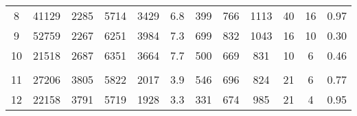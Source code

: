 \begin{tabular}[t]{cccccccccccc}
\hspace{1em}8 & 41129 & 2285 & 5714 & 3429 & 6.8 & 399 & 766 & 1113 & 40 & 16 & 0.97\\
\hspace{1em}9 & 52759 & 2267 & 6251 & 3984 & 7.3 & 699 & 832 & 1043 & 16 & 10 & 0.30\\
\hspace{1em}10 & 21518 & 2687 & 6351 & 3664 & 7.7 & 500 & 669 & 831 & 10 & 6 & 0.46\\
\addlinespace[0.3em]
\multicolumn{12}{l}{\textbf{Titicaca basin}}\\
\hspace{1em}11 & 27206 & 3805 & 5822 & 2017 & 3.9 & 546 & 696 & 824 & 21 & 6 & 0.77\\
\hspace{1em}12 & 22158 & 3791 & 5719 & 1928 & 3.3 & 331 & 674 & 985 & 21 & 4 & 0.95\\
\bottomrule
\end{tabular}
